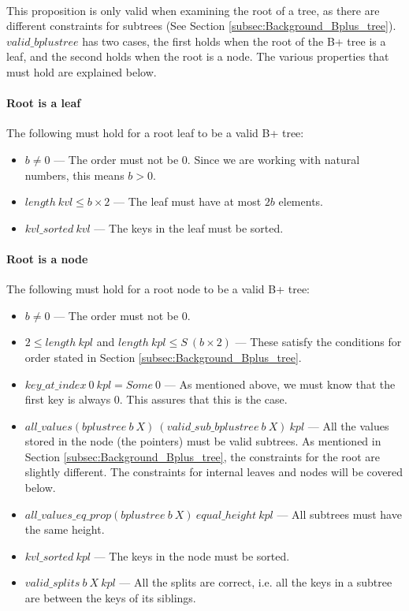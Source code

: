 \paragraph{}
This proposition is only valid when examining the root of a tree, as there are different constraints for subtrees (See Section \ref{subsec:Background_Bplus_tree}). $valid\_bplustree$ has two cases, the first holds when the root of the B+ tree is a leaf, and the second holds when the root is a node. The various properties that must hold are explained below.

\paragraph{Root is a leaf}
The following must hold for a root leaf to be a valid B+ tree:
\label{valid_root_is_a_leaf}
\begin{itemize}
\item $b \neq 0$ --- The order must not be 0. Since we are working with natural numbers, this means $b > 0$.
\item $length\ kvl \leq b \times 2 $ --- The leaf must have at most $2b$ elements.
\item $kvl\_sorted\ kvl$ --- The keys in the leaf must be sorted.
\end{itemize}

\paragraph{Root is a node}
The following must hold for a root node to be a valid B+ tree:
\label{valid_root_is_a_node}
\begin{itemize}
\item $b \neq 0$ --- The order must not be 0.
\item $2 \leq length\ kpl$ and $length\ kpl \leq S\ (b \times 2)$ --- These satisfy the conditions for order stated in Section \ref{subsec:Background_Bplus_tree}.
\item $key\_at\_index\ 0\ kpl = Some\ 0$ --- As mentioned above, we must know that the first key is always 0. This assures that this is the case.
\item $all\_values (bplustree\ b\ X)\ (valid\_sub\_bplustree\ b\ X)\ kpl$ --- All the values stored in the node (the pointers) must be valid subtrees. As mentioned in Section \ref{subsec:Background_Bplus_tree}, the constraints for the root are slightly different. The constraints for internal leaves and nodes will be covered below.
\item $all\_values\_eq\_prop (bplustree\ b\ X)\ equal\_height\ kpl$ --- All subtrees must have the same height.
\item $kvl\_sorted\ kpl$ --- The keys in the node must be sorted.
\item $valid\_splits\ b \ X\ kpl$ --- All the splits are correct, i.e. all the keys in a subtree are between the keys of its siblings.
\end{itemize}

